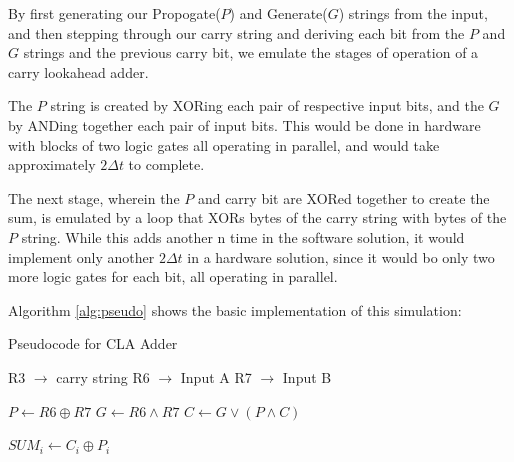 \documentclass[journal]{IEEEtran}
\begin{document}
By first generating our Propogate($P$) and Generate($G$) strings from the input,
and then stepping through our carry string and deriving each bit from the
$P$ and $G$ strings and the previous carry bit, we emulate the stages of
operation of a carry lookahead adder.

The $P$ string is created by XORing each pair of respective input bits, and the
$G$ by ANDing together each pair of input bits. This would be done in hardware
with blocks of two logic gates all operating in parallel, and would take
approximately $2\Delta t$ to complete.

The next stage, wherein the $P$ and carry bit are XORed together to create the
sum, is emulated by a loop that XORs bytes of the carry string with bytes of
the $P$ string. While this adds another n time in the software solution, it
would implement only another $2\Delta t$ in a hardware solution, since it would
bo only two more logic gates for each bit, all operating in parallel.

Algorithm \ref{alg:pseudo}
shows the basic implementation of this simulation:
\begin{algorithm}[H]
\caption{Pseudocode for CLA Adder}
\label{alg:pseudo}
\begin{algorithmic}
\State R3 $\rightarrow$ carry string
\State R6 $\rightarrow$ Input A
\State R7 $\rightarrow$ Input B

	\State $P \gets R6 \oplus R7$
	\State $G \gets R6 \land R7$
\EndFor
{}
	\State $C \gets G \lor (P \land C)$
\EndFor

	\State $SUM_i \gets C_i \oplus P_i$
\EndFor
\end{algorithmic}
\end{algorithm}
\end{document}
